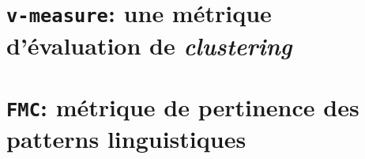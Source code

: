 \label{annex:D-ANNEXE-TECHNIQUE}


	\minitoc

	\section{\texttt{v-measure}: une métrique d'évaluation de \textit{clustering}}
	\label{annex:D.1-TECHNIQUE-VMEASURE}

	\section{\texttt{FMC}: métrique de pertinence des patterns linguistiques}
	\label{annex:D.2-TECHNIQUE-FMC-CLUSTERING}
